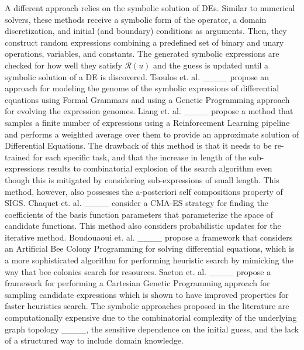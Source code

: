 A different approach relies on the symbolic solution of DEs. Similar to numerical solvers, these methods receive a symbolic form of the operator, a domain discretization, and initial (and boundary) conditions as arguments. Then, they construct random expressions combining a predefined set of binary and unary operations, variables, and constants. The generated symbolic expressions are checked for how well they satisfy $\mathcal{R}(u)$ and the guess is updated until a symbolic solution of a DE is discovered. Tsoulos et. al. ____ propose an approach for modeling the genome of the symbolic expressions of differential equations using Formal Grammars and using a Genetic Programming approach for evolving the expression genomes. Liang et. al. ____ propose a method that samples a finite number of expressions using a Reinforcement Learning pipeline and performs a weighted average over them to provide an approximate solution of Differential Equations. The drawback of this method is that it needs to be re-trained for each specific task, and that the increase in length of the sub-expressions results to combinatorial explosion of the search algorithm even though this is mitigated by considering sub-expressions of small length. This method, however, also possesses the a-posteriori self compositions property of SIGS. Chaquet et. al. ____ consider a CMA-ES strategy for finding the coefficients of the basis function parameters that parameterize the space of candidate functions. This method also considers probabilistic updates for the iterative method. Boudouaoui et. al. ____ propose a framework that considers an Artificial Bee Colony Programming for solving differential equations, which is a more sophisticated algorithm for performing heuristic search by mimicking the way that bee colonies search for resources. Saeton et. al. ____ propose a framework for performing a Cartesian Genetic Programming approach for sampling candidate expressions which is shown to have improved properties for faster heuristics search. The symbolic approaches proposed in the literature are computationally expensive due to the combinatorial complexity of the underlying graph topology ____, the sensitive dependence on the initial guess, and the lack of a structured way to include domain knowledge. 

